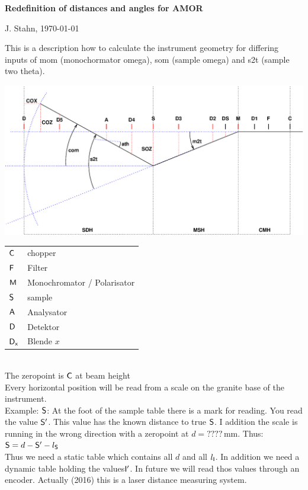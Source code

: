 \documentclass[12]{article}
\begin{document}
\textbf{Redefinition of distances and angles for  AMOR}

J. Stahn, \today
\vfill

This is a description how to calculate the instrument geometry for
differing inputs of mom (monochormator omega), som (sample omega) and
s2t (sample two theta). 

\includegraphics[width=\textwidth]{distances.eps}
\vfill

\begin{tabular}{ll}
 $\sf C   $ & chopper \\
 $\sf F   $ & Filter \\
 $\sf M   $ & Monochromator / Polarisator \\
 $\sf S   $ & sample \\
 $\sf A   $ & Analysator  \\
 $\sf D   $ & Detektor \\
 $\sf D_x $ & Blende $x$ \\
\end{tabular} \\

The zeropoint is  $\sf C$ at beam height \\

Every horizontal position will be read from a scale on the granite
base of the instrument.  \\
Example: $\sf S$: At the foot of the sample table there is a mark for
reading. You read the value $\sf S'$. 
This value has the known distance  to true $\sf S$.
I addition the scale is running in the wrong direction with a
zeropoint at  $d = ???? \,\mathrm{mm}$. Thus: \\
${\sf S} = d - {\sf S'} - l_{\sf S}$ \\

Thus we need a static table which contains all $d$ 
and all $l_{\sf I}$. In addition we need a  dynamic table holding the
values$\sf I'$. In future we will read thos values through an
encoder. Actually (2016) this is a laser distance measuring system.
\end{document}

